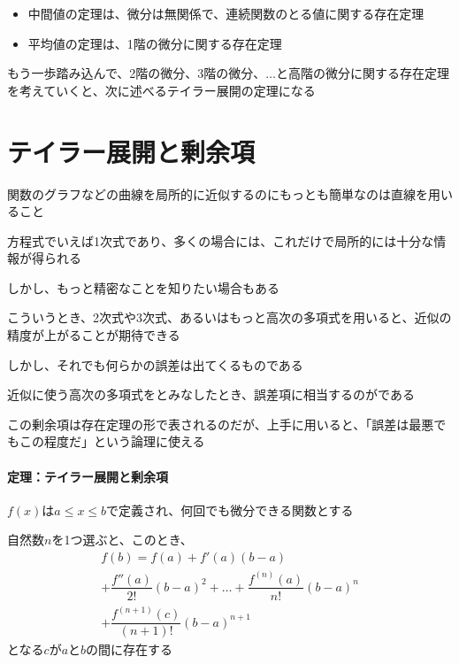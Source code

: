 \documentclass[../book_jiriki_calc]{subfiles}
\begin{document}
\sectionline

\begin{itemize}
  \item 中間値の定理は、微分は無関係で、連続関数のとる値に関する存在定理
  \item 平均値の定理は、1階の微分に関する存在定理
\end{itemize}

もう一歩踏み込んで、2階の微分、3階の微分、$\ldots$と高階の微分に関する存在定理を考えていくと、次に述べるテイラー展開の定理になる

\section{テイラー展開と剰余項}

関数のグラフなどの曲線を局所的に近似するのにもっとも簡単なのは直線を用いること

方程式でいえば1次式であり、多くの場合には、これだけで局所的には十分な情報が得られる

\br

しかし、もっと精密なことを知りたい場合もある

こういうとき、2次式や3次式、あるいはもっと高次の多項式を用いると、近似の精度が上がることが期待できる

\br

しかし、それでも何らかの誤差は出てくるものである

近似に使う高次の多項式をとみなしたとき、誤差項に相当するのがである

\br

この剰余項は存在定理の形で表されるのだが、上手に用いると、「誤差は最悪でもこの程度だ」という論理に使える

\sectionline

\paragraph{定理：テイラー展開と剰余項}

$f(x)$は$a \leq x \leq b$で定義され、何回でも微分できる関数とする

自然数$n$を1つ選ぶと、このとき、
\begin{multline}
  f(b) = f(a) + f'(a)(b-a) \\+ \dfrac{f''(a)}{2!}(b-a)^2 + \ldots + \dfrac{f^{(n)}(a)}{n!}(b-a)^n \\
  + \dfrac{f^{(n+1)}(c)}{(n+1)!}(b-a)^{n+1}
\end{multline}
となる$c$が$a$と$b$の間に存在する
\end{document}
